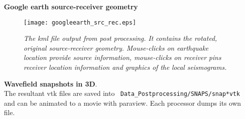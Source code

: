 \documentclass[11pt,letter,fleqn,english,notitlepage]{article}
\begin{document}
\noindent \textbf{Google earth source-receiver geometry}\\
\begin{figure*}[htb]
    \begin{center}
        \texttt{[image: googleearth\_src\_rec.eps]}
        \caption{\textit{The kml file output from post processing. It contains
        the rotated, original source-receiver geometry. Mouse-clicks on
        earthquake location provide source information, mouse-clicks on
        receiver pins receiver location information and graphics of the local
        seismograms.}}
    \end{center}
\end{figure*}

\noindent \textbf{Wavefield snapshots in 3D}.\\
The resultant vtk files are saved into {\tt
Data\_Postprocessing/SNAPS/snap*vtk} and can be animated to a movie with
paraview. Each processor dumps its own file.\\
% 
% 
% 
\end{document}
